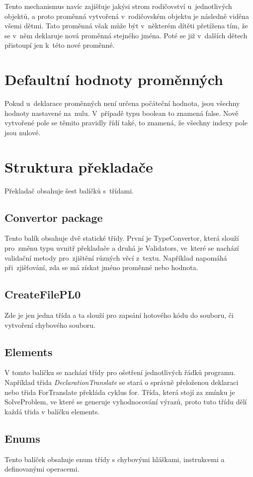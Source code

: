 \documentclass[czech]{thesiskiv}
\begin{document}
Tento mechanismus navíc zajišťuje jakýsi strom rodičovství u~jednotlivých objektů, a proto 
proměnná vytvořená v~rodičovském objektu je následně viděna všemi dětmi. Tato proměnná však může 
být v~některém dítěti přetížena tím, že se v~něm deklaruje nová proměnná stejného jména. 
Poté se již v~dalších dětech přistoupí jen k~této nové proměnné.

\section{Defaultní hodnoty proměnných}
Pokud u~deklarace proměnných není určena počáteční hodnota, jsou všechny hodnoty nastavené na~nulu. 
V~případě typu boolean to znamená false. Nově vytvořené pole se těmito pravidly řídí také, 
to znamená, že všechny indexy pole jsou nulové.

\section{Struktura překladače}
Překladač obsahuje šest balíčků s~třídami.

\subsection{Convertor package}
Tento balík obsahuje dvě statické třídy. První je TypeConvertor, která slouží pro~změnu 
typu uvnitř překladače a druhá je Validators, ve~které se nachází validační metody pro~zjištění různých věcí z~textu. 
Například napomáhá při~zjišťování, zda se má získat jméno proměnné nebo hodnota.

\subsection{CreateFilePL0}
Zde je jen jedna třída a ta slouží pro zapsání hotového kódu do souboru, či vytvoření chybového souboru.

\subsection{Elements}
V tomto balíčku se nachází třídy pro ošetření jednotlivých řádků programu. 
Například třida \textit{DeclarationTranslate} se stará o správně přeloženou deklaraci nebo třida ForTranslate překláda cyklus for. 
Třída, která stojí za zmínku je SolveProblem, ve které se generuje vyhodnocování výrazů, proto tuto třídu dělí každá třida v balíčku elements.

\subsection{Enums}
Tento balíček obsahuje enum třídy s chybovými hláškami, instrukcemi a definovanými operacemi.
\end{document}

